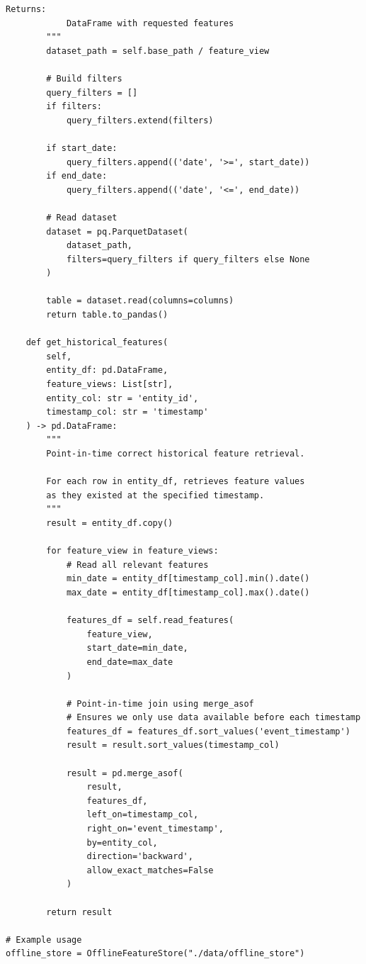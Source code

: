 \begin{lstlisting}[style=python, caption=Scalable offline feature store with partitioning]
        Returns:
            DataFrame with requested features
        """
        dataset_path = self.base_path / feature_view

        # Build filters
        query_filters = []
        if filters:
            query_filters.extend(filters)

        if start_date:
            query_filters.append(('date', '>=', start_date))
        if end_date:
            query_filters.append(('date', '<=', end_date))

        # Read dataset
        dataset = pq.ParquetDataset(
            dataset_path,
            filters=query_filters if query_filters else None
        )

        table = dataset.read(columns=columns)
        return table.to_pandas()

    def get_historical_features(
        self,
        entity_df: pd.DataFrame,
        feature_views: List[str],
        entity_col: str = 'entity_id',
        timestamp_col: str = 'timestamp'
    ) -> pd.DataFrame:
        """
        Point-in-time correct historical feature retrieval.

        For each row in entity_df, retrieves feature values
        as they existed at the specified timestamp.
        """
        result = entity_df.copy()

        for feature_view in feature_views:
            # Read all relevant features
            min_date = entity_df[timestamp_col].min().date()
            max_date = entity_df[timestamp_col].max().date()

            features_df = self.read_features(
                feature_view,
                start_date=min_date,
                end_date=max_date
            )

            # Point-in-time join using merge_asof
            # Ensures we only use data available before each timestamp
            features_df = features_df.sort_values('event_timestamp')
            result = result.sort_values(timestamp_col)

            result = pd.merge_asof(
                result,
                features_df,
                left_on=timestamp_col,
                right_on='event_timestamp',
                by=entity_col,
                direction='backward',
                allow_exact_matches=False
            )

        return result

# Example usage
offline_store = OfflineFeatureStore("./data/offline_store")


\end{lstlisting}
